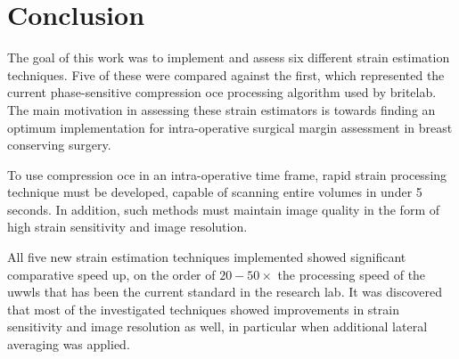\chapter{Conclusion}

The goal of this work was to implement and assess six different strain estimation techniques. Five of these were compared against the first, which represented the current phase-sensitive compression \ac{oce} processing algorithm used by \ac{britelab}. The main motivation in assessing these strain estimators is towards finding an optimum implementation for intra-operative surgical margin assessment in breast conserving surgery. 

To use compression \ac{oce} in an intra-operative time frame, rapid strain processing technique must be developed, capable of scanning entire volumes in under 5 seconds. In addition, such methods must maintain image quality in the form of high strain sensitivity and image resolution. 

All five new strain estimation techniques implemented showed significant comparative speed up, on the order of $20-50\times$ the processing speed of the \ac{uwwls} that has been the current standard in the research lab. It was discovered that most of the investigated techniques showed improvements in strain sensitivity and image resolution as well, in particular when additional lateral averaging was applied. 

